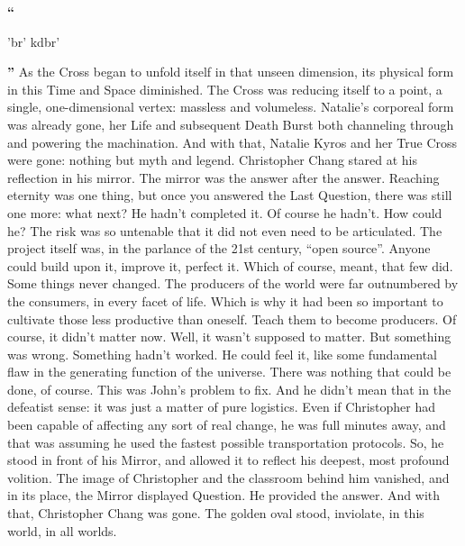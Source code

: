 \SmallVSpace
‎‎\textbf{``}\begin{cjhebrew}'br' kdbr'\end{cjhebrew}\textbf{''}
\SmallVSpace
As the Cross began to unfold itself in that unseen dimension, its physical form in this Time and Space diminished. The Cross was reducing itself to a point, a single, one-dimensional vertex: massless and volumeless. Natalie’s corporeal form was already gone, her Life and subsequent Death Burst both channeling through and powering the machination.
\SomeVSpace
And with that, Natalie Kyros and her True Cross were gone: nothing but myth and legend.
\simpleline
{}
Christopher Chang stared at his reflection in his mirror. The mirror was the answer after the answer. Reaching eternity was one thing, but once you answered the Last Question, there was still one more: what next?
\SmallVSpace
He hadn’t completed it. Of course he hadn’t. How could he? The risk was so untenable that it did not even need to be articulated. The project itself was, in the parlance of the 21st century, “open source”. Anyone could build upon it, improve it, perfect it. Which of course, meant, that few did. Some things never changed. The producers of the world were far outnumbered by the consumers, in every facet of life.
\SmallVSpace
Which is why it had been so important to cultivate those less productive than oneself. Teach them to become producers. Of course, it didn’t matter now. Well, it wasn’t supposed to matter. But something was wrong. Something hadn’t worked. He could feel it, like some fundamental flaw in the generating function of the universe.
\SmallVSpace
There was nothing that could be done, of course. This was John’s problem to fix. And he didn’t mean that in the defeatist sense: it was just a matter of pure logistics. Even if Christopher had been capable of affecting any sort of real change, he was full minutes away, and that was assuming he used the fastest possible transportation protocols.
\SmallVSpace
So, he stood in front of his Mirror, and allowed it to reflect his deepest, most profound volition. The image of Christopher and the classroom behind him vanished, and in its place, the Mirror displayed Question.
\SmallVSpace
He provided the answer. And with that, Christopher Chang was gone.
\SomeVSpace
The golden oval stood, inviolate, in this world, in all worlds.
\simpleline
{}

